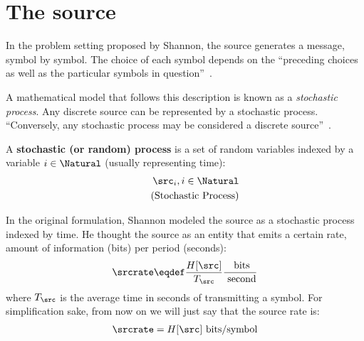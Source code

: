\section{The source} In the problem setting proposed by Shannon, the source generates a message, symbol by symbol. The choice of each symbol depends on the ``preceding choices as well as the particular symbols in question''~\cite[p.10]{shannon:1949}.

A mathematical model that follows this description is known as a \emph{stochastic process}. Any discrete source can be represented by a stochastic process. ``Conversely, any stochastic process may be considered a discrete source''~\cite{shannon:1949}.
\begin{definition}
	A \textbf{stochastic (or random) process} is a set of random variables indexed by a variable \(i \in \Natural\) (usually representing time):
	\begin{align}
		{\src_i}, i \in \Natural \\
		\tag{Stochastic Process}
	\end{align}
\end{definition}

In the original formulation, Shannon modeled the source as a stochastic process indexed by time. He thought the source as an entity that emits a certain rate, amount of information (bits) per period (seconds):
\begin{align}
\srcrate \eqdef \frac{H[\src]}{T_{\src}} \frac{\text{ bits}}{\text{ second}}
\end{align}
where \(T_{\src}\) is the average time in seconds of transmitting a symbol.
For simplification sake, from now on we will just say that the source rate is:
\begin{align}
	\srcrate = H[\src] \text{ bits/symbol}
	\end{align}

